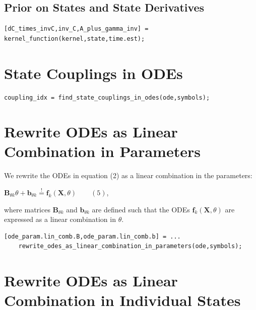 \subsection{Prior on States and State Derivatives}

\color{RoyalPurple}\begin{verbatim}
[dC_times_invC,inv_C,A_plus_gamma_inv] = kernel_function(kernel,state,time.est);
\end{verbatim}
\color{black}


\section{State Couplings in ODEs}

\color{RoyalPurple}\begin{verbatim}
coupling_idx = find_state_couplings_in_odes(ode,symbols);
\end{verbatim}
\color{black}


\section{Rewrite ODEs as Linear Combination in Parameters}

\begin{par}
We rewrite the ODEs in equation (2) as a linear combination in the parameters:
\end{par} \vspace{1em}
\begin{par}
$\mathbf{B}_{\theta k} \theta + \mathbf{b}_{\theta k} \stackrel{!}{=} \mathbf{f}_k(\mathbf{X},\theta) \qquad (5)$,
\end{par} \vspace{1em}
\begin{par}
where matrices $\mathbf{B}_{\theta k}$ and $\mathbf{b}_{\theta k}$ are defined such that the ODEs $\mathbf{f}_k(\mathbf{X},\theta)$ are expressed as a linear combination in $\theta$.
\end{par} \vspace{1em}
\color{RoyalPurple}\begin{verbatim}
[ode_param.lin_comb.B,ode_param.lin_comb.b] = ...
    rewrite_odes_as_linear_combination_in_parameters(ode,symbols);
\end{verbatim}
\color{black}


\section{Rewrite ODEs as Linear Combination in Individual States}

